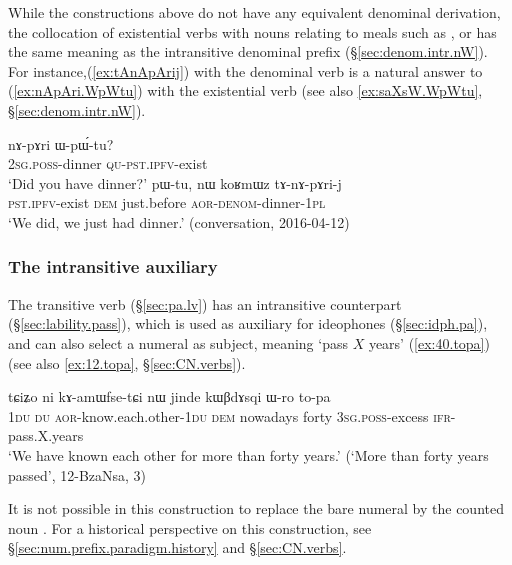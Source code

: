 
While the constructions above do not have any equivalent denominal derivation, the collocation of existential verbs with nouns relating to meals such as ,  or  has the same meaning as the intransitive  denominal prefix (§\ref{sec:denom.intr.nW}). For instance,(\ref{ex:tAnApArij}) with the denominal verb  is a natural answer to (\ref{ex:nApAri.WpWtu}) with the existential verb (see also \ref{ex:saXsW.WpWtu}, §\ref{sec:denom.intr.nW}).

\begin{exe}
\ex \label{ex:nApAri.WpWtu}
\gll nɤ-pɤri ɯ-pɯ́-tu? \\
\textsc{2sg}.\textsc{poss}-dinner \textsc{qu}-\textsc{pst}.\textsc{ipfv}-exist \\
\glt `Did you have dinner?'
\ex \label{ex:tAnApArij}
\gll pɯ-tu, nɯ koʁmɯz tɤ-nɤ-pɤri-j \\
\textsc{pst}.\textsc{ipfv}-exist \textsc{dem} just.before \textsc{aor}-\textsc{denom}-dinner-\textsc{1pl} \\
\glt `We did, we just had dinner.' (conversation, 2016-04-12)
\end{exe}
  
  \subsubsection{The intransitive auxiliary  } \label{sec:pa.intr.lv}
The transitive verb  (§\ref{sec:pa.lv}) has an intransitive counterpart   (§\ref{sec:lability.pass}), which is used as auxiliary for ideophones (§\ref{sec:idph.pa}), and can also select a numeral as subject, meaning `pass $X$ years' (\ref{ex:40.topa}) (see also \ref{ex:12.topa}, §\ref{sec:CN.verbs}).

\begin{exe}
\ex \label{ex:40.topa}  
\gll tɕiʑo ni kɤ-amɯfse-tɕi nɯ jinde kɯβdɤsqi ɯ-ro to-pa \\
\textsc{1du} \textsc{du} \textsc{aor}-know.each.other-\textsc{1du} \textsc{dem} nowadays forty \textsc{3sg}.\textsc{poss}-excess \textsc{ifr}-pass.X.years \\
\glt  `We have known each other for more than forty years.' (`More than forty years passed', 12-BzaNsa, 3)
\end{exe}		

It is not possible in this construction to replace the bare numeral by the counted noun  . For a historical perspective on this construction, see §\ref{sec:num.prefix.paradigm.history} and §\ref{sec:CN.verbs}.

